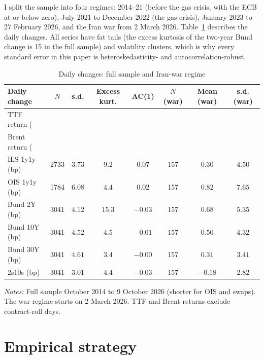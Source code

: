 \documentclass[11pt,a4paper]{article}
\begin{document}
I split the sample into four regimes: 2014--21 (before the gas crisis, with the ECB at or below zero), July 2021 to
December 2022 (the gas crisis), January 2023 to 27 February 2026, and the Iran war from 2 March 2026. Table~\ref{tab:desc}
describes the daily changes. All series have fat tails (the excess kurtosis of the two-year Bund change is 15 in the
full sample) and volatility clusters, which is why every standard error in this paper is heteroskedasticity- and
autocorrelation-robust.

\begin{table}[htbp]\centering\footnotesize
\caption{Daily changes: full sample and Iran-war regime}\label{tab:desc}
\setlength{\tabcolsep}{5pt}
\begin{tabular}{@{}lccccccc@{}}
\toprule
Daily change & $N$ & s.d. & Excess kurt. & AC(1) & $N$ (war) & Mean (war) & s.d. (war)\\\midrule
TTF return (\\%
Brent return (\\%
ILS 1y1y (bp) & 2733 & $3.73$ & $9.2$ & $0.07$ & 157 & $0.30$ & $4.50$\\
OIS 1y1y (bp) & 1784 & $6.08$ & $4.4$ & $0.02$ & 157 & $0.82$ & $7.65$\\
Bund 2Y (bp) & 3041 & $4.12$ & $15.3$ & $-0.03$ & 157 & $0.68$ & $5.35$\\
Bund 10Y (bp) & 3041 & $4.52$ & $4.5$ & $-0.01$ & 157 & $0.50$ & $4.32$\\
Bund 30Y (bp) & 3041 & $4.61$ & $3.4$ & $-0.00$ & 157 & $0.31$ & $3.41$\\
2s10s (bp) & 3041 & $3.01$ & $4.4$ & $-0.03$ & 157 & $-0.18$ & $2.82$\\
\bottomrule
\end{tabular}
\par\vspace{4pt}\begin{minipage}{0.92\textwidth}\scriptsize\textit{Notes:} Full sample October 2014 to 9 October 2026 (shorter for OIS and swaps). The war regime starts on 2 March 2026. TTF and Brent returns exclude contract-roll days.\end{minipage}
\end{table}

\section{Empirical strategy}\label{sec:method}
\end{document}
